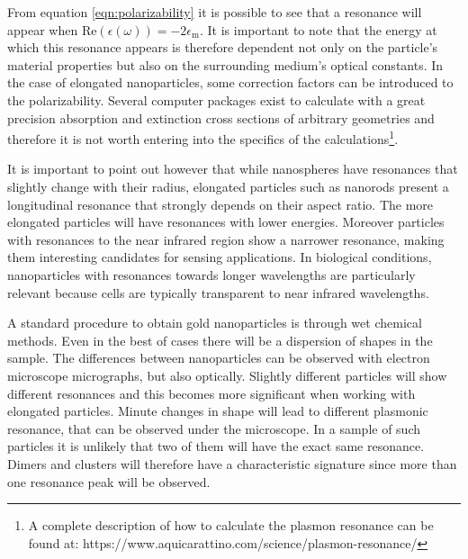 From equation \ref{eqn:polarizability} it is possible to see that a resonance
will appear when $\textrm{Re}(\epsilon(\omega)) = -2\epsilon_\textrm{m}$. It is
important to note that the energy at which this resonance appears is therefore
dependent not only on the particle's material properties but also on the
surrounding medium's optical constants. In the case of elongated nanoparticles,
some correction factors can be introduced to the polarizability. Several
computer packages\cite{Yurkin2011,oskooi2010meep,draine2013user} exist to
calculate with a great precision absorption and extinction cross sections of
arbitrary geometries and therefore it is not worth entering into the specifics
of the calculations\footnote{A complete description of how to calculate the
plasmon resonance can be found at:\newline
https://www.aquicarattino.com/science/plasmon-resonance/}.

\begin{sloppypar}
It is important to point out however that while nanospheres have resonances
that slightly change with their radius, elongated particles such as nanorods
present a longitudinal resonance that strongly depends on their aspect ratio.
The more elongated particles will have resonances with lower energies. Moreover
particles with resonances to the near infrared region show a narrower
resonance\cite{Sonnichsen2002}, making them interesting candidates for sensing
applications. In biological conditions, nanoparticles with resonances towards
longer wavelengths are particularly relevant because cells are typically
transparent to near infrared wavelengths.
\end{sloppypar}

\begin{sloppypar}
A standard procedure to obtain gold nanoparticles is through wet chemical
methods\cite{Vigderman2012}. Even in the best of cases there will be a
dispersion of shapes in the sample. The differences between nanoparticles can be
observed with electron microscope micrographs, but also optically. Slightly
different particles will show different resonances\cite{Lindfors2004} and this
becomes more significant when working with elongated particles. Minute changes
in shape will lead to different plasmonic resonance, that can be observed under the
microscope. In a sample of such particles it is unlikely that two of them will
have the exact same resonance. Dimers and clusters will therefore have a
characteristic signature since more than one resonance peak will be observed.
\end{sloppypar}

